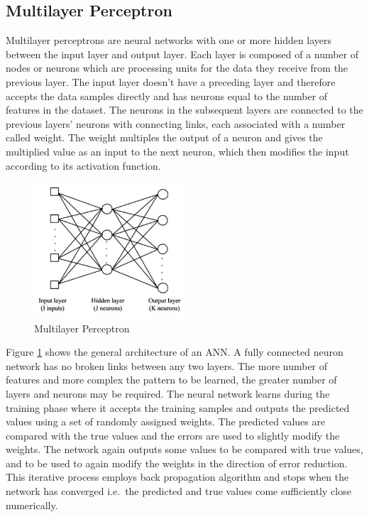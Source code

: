 \documentclass[]{article}
\begin{document}
\hypertarget{multilayer-perceptron}{%
\subsection{Multilayer Perceptron}\label{multilayer-perceptron}}

Multilayer perceptrons are neural networks with one or more hidden layers between the input layer and output layer. Each layer is composed of a number of nodes or neurons which are processing units for the data they receive from the previous layer. The input layer doesn't have a preceding layer and therefore accepts the data samples directly and has neurons equal to the number of features in the dataset. The neurons in the subsequent layers are connected to the previous layers' neurons with connecting links, each associated with a number called weight. The weight multiples the output of a neuron and gives the multiplied value as an input to the next neuron, which then modifies the input according to its activation function.

\begin{figure}
\centering
\includegraphics[width=0.5\textwidth,height=\textheight]{images/mlp.jpg}
\caption{Multilayer Perceptron \label{fig:mlp}}
\end{figure}

Figure \ref{fig:mlp} shows the general architecture of an ANN. A fully connected neuron network has no broken links between any two layers. The more number of features and more complex the pattern to be learned, the greater number of layers and neurons may be required.
The neural network learns during the training phase where it accepts the training samples and outputs the predicted values using a set of randomly assigned weights. The predicted values are compared with the true values and the errors are used to slightly modify the weights. The network again outputs some values to be compared with true values, and to be used to again modify the weights in the direction of error reduction. This iterative process employs back propagation algorithm and stops when the network has converged i.e.~the predicted and true values come sufficiently close numerically.
\end{document}
